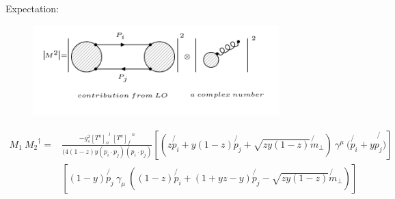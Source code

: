 
Expectation:
\begin{figure}[h!]
\centering
\includegraphics[width=0.85\textwidth]{images/QQ/expectationM1M2dagger.png}
\end{figure}

\begin{equation}
\begin{split}
M_1\: {M_2}^{\dagger} =& \frac{-g_s^2 {[T^a]_o}^l \:{[T^a]_{f^{\prime}}}^n }{(4(1-z)y(p_i \cdot p_j)(p_i \cdot p_j)} [(z\not{p_i} + y(1-z)\not{p_j} + \sqrt{zy(1-z)}\not{m}_{\bot})\: \gamma^{\mu} \: (\not{p_i} + y\not{p_j)}]\\
&[(1-y) \not{p_j} \:\gamma_{\mu} \: ((1-z)\not{p_i} + (1+yz-y) \not{p_j} - \sqrt{zy(1-z)}\not{m}_{\bot})]\:
\end{split}
\end{equation}

